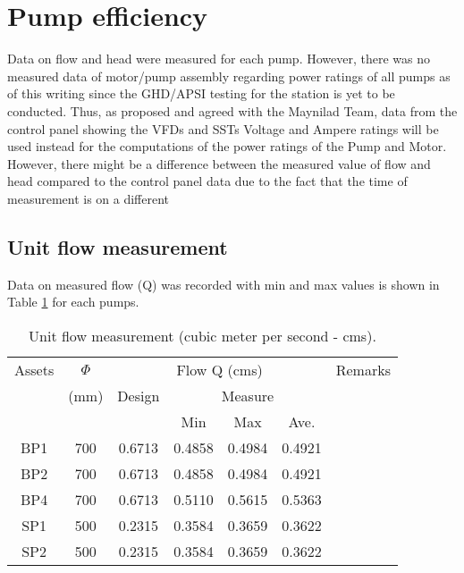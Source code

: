 \section{Pump efficiency} \label{ch04mech03}
Data on flow and head were measured for each pump. However, there was no measured data of motor/pump assembly regarding power ratings of all pumps as of this writing since the GHD/APSI testing for the station is yet to be conducted. Thus, as proposed and agreed with the Maynilad Team, data from the control panel showing the VFDs and SSTs Voltage and Ampere ratings will be used instead for the computations of the power ratings of the Pump and Motor. However, there might be a difference between the measured value of flow and head compared to the control panel data due to the fact that the time of measurement is on a different 

\subsection{Unit flow measurement} \label{ch04mech04}
Data on measured flow (Q) was recorded with min and max values is shown in Table \ref{ch04_tbl_flow01} for each pumps. %

\begin{table}[!h]
	\caption{Unit flow measurement (cubic meter per second - cms).}
	\label{ch04_tbl_flow01}
	{\footnotesize
\begin{tabular}{c|c|c|c|c|c|l}
	\hline
Assets & $\Phi$  & \multicolumn{4}{c|}{Flow Q (cms)} & \multicolumn{1}{c}{Remarks} \\ 
\cline{3-6}
 & (mm) & Design & \multicolumn{3}{c|}{Measure} & \multicolumn{1}{c}{} \\ 
\cline{4-6}
 &  &  & Min & Max & Ave. & \multicolumn{1}{c}{} \\ 
\hline
BP1 & 700 & 0.6713 & 0.4858 & 0.4984 & 0.4921 & \multicolumn{1}{c}{} \\ 
BP2 & 700 & 0.6713 & 0.4858 & 0.4984 & 0.4921 & \multicolumn{1}{c}{} \\ 
BP4 & 700 & 0.6713 & 0.5110 & 0.5615 & 0.5363 & \multicolumn{1}{c}{} \\ 
SP1 & 500 & 0.2315 & 0.3584 & 0.3659 & 0.3622 & \multicolumn{1}{c}{} \\ 
SP2 & 500 & 0.2315 & 0.3584 & 0.3659 & 0.3622 & \multicolumn{1}{c}{} \\ 
\hline
\end{tabular}

	}
\end{table}

